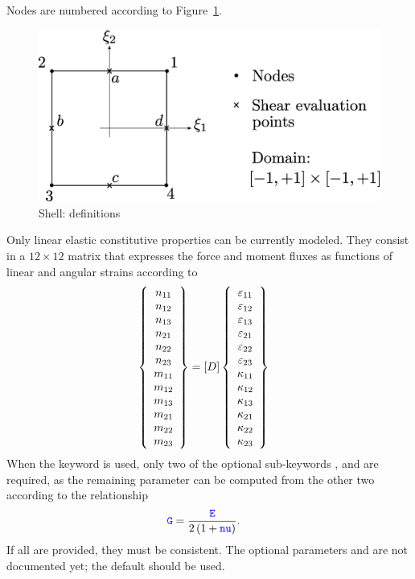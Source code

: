 Nodes are numbered according to Figure~\ref{fig:EL:PLATE:SHELL4:sketch}.
\begin{figure}
\centering
\includegraphics[width=.6\textwidth]{shellPic}
\caption{Shell: definitions}
\label{fig:EL:PLATE:SHELL4:sketch}
\end{figure}

Only linear elastic constitutive properties can be currently modeled.
They consist in a $12 \times 12$ matrix that expresses the force and moment
fluxes as functions of linear and angular strains according to
\begin{align}
	\left\{ \begin{array}{c} 
		n_{11} \\
		n_{12} \\
		n_{13} \\
		n_{21} \\
		n_{22} \\
		n_{23} \\
		m_{11} \\
		m_{12} \\
		m_{13} \\
		m_{21} \\
		m_{22} \\
		m_{23}
	 \end{array} \right\}
	&=
	\left[ D \right]
	\left\{ \begin{array}{c} 
		\varepsilon_{11} \\
		\varepsilon_{12} \\
		\varepsilon_{13} \\
		\varepsilon_{21} \\
		\varepsilon_{22} \\
		\varepsilon_{23} \\
		\kappa_{11} \\
		\kappa_{12} \\
		\kappa_{13} \\
		\kappa_{21} \\
		\kappa_{22} \\
		\kappa_{23}
	 \end{array} \right\}
\end{align}
When the  keyword is used, only two of the optional
sub-keywords ,  and  are required, as the remaining
parameter can be computed from the other two according to the relationship
\begin{align}
	\textcolor{blue}{\texttt{G}}
	&=
	\frac{\textcolor{blue}{\texttt{E}}}{2\left( 1 + \textcolor{blue}{\texttt{nu}} \right)}
	.
\end{align}
If all are provided, they must be consistent.
The optional parameters  and  are not documented yet;
the default should be used.


